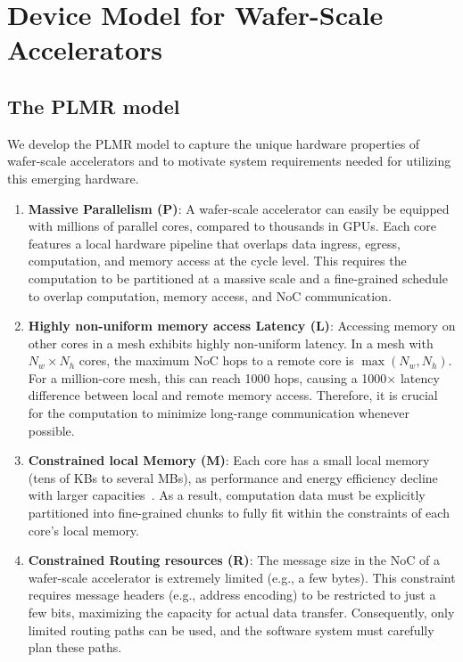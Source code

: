 \vspace{-0.3cm}
\section{Device Model for Wafer-Scale Accelerators}
\vspace{-0.2cm}

\subsection{The PLMR model}
\vspace{-0.1cm}
We develop the PLMR model to capture the unique hardware properties of wafer-scale accelerators and to motivate system requirements needed for utilizing this emerging hardware.

\begin{enumerate}[label=(\arabic*), leftmargin=0.5cm, noitemsep,topsep=0pt]
    \item \textbf{Massive Parallelism (P)}:
A wafer-scale accelerator can easily be equipped with millions of parallel cores, compared to thousands in GPUs. Each core features a local hardware pipeline that overlaps data ingress, egress, computation, and memory access at the cycle level.
This requires the computation to be partitioned at a massive scale and a fine-grained schedule to overlap computation, memory access, and NoC communication.

\item \textbf{Highly non-uniform memory access Latency (L)}:
Accessing memory on other cores in a mesh exhibits highly non-uniform latency. In a mesh with \(N_w \times N_h\) cores, the maximum NoC hops to a remote core is \(\max(N_w, N_h)\). For a million-core mesh, this can reach 1000 hops, causing a 1000$\times$ latency difference between local and remote memory access.
Therefore, it is crucial for the computation to minimize long-range communication whenever possible.

\item \textbf{Constrained local Memory (M)}: Each core has a small local memory (tens of KBs to several MBs), as performance and energy efficiency decline with larger capacities~\cite{sram-wiki}.
As a result, computation data must be explicitly partitioned into fine-grained chunks to fully fit within the constraints of each core's local memory.

\item \textbf{Constrained Routing resources (R)}: 
The message size in the NoC of a wafer-scale accelerator is extremely limited (e.g., a few bytes). This constraint requires message headers (e.g., address encoding) to be restricted to just a few bits, maximizing the capacity for actual data transfer. Consequently, only limited routing paths can be used, and the software system must carefully plan these paths.
\end{enumerate}

